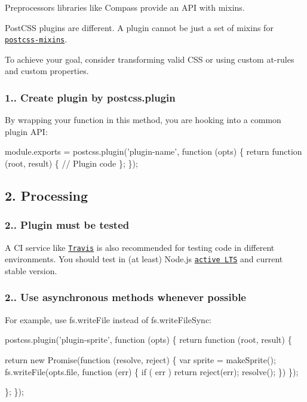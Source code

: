 Preprocessors libraries like Compass provide an A\+PI with mixins.

Post\+C\+SS plugins are different. A plugin cannot be just a set of mixins for \href{https://github.com/postcss/postcss-mixins}{\tt postcss-\/mixins}.

To achieve your goal, consider transforming valid C\+SS or using custom at-\/rules and custom properties.

\subsubsection*{1.. Create plugin by {\ttfamily postcss.\+plugin}}

By wrapping your function in this method, you are hooking into a common plugin A\+PI\+:


\begin{DoxyCode}
module.exports = postcss.plugin('plugin-name', function (opts) \{
    return function (root, result) \{
        // Plugin code
    \};
\});
\end{DoxyCode}


\subsection*{2. Processing}

\subsubsection*{2.. Plugin must be tested}

A CI service like \href{https://travis-ci.org/}{\tt Travis} is also recommended for testing code in different environments. You should test in (at least) Node.\+js \href{https://github.com/nodejs/LTS}{\tt active L\+TS} and current stable version.

\subsubsection*{2.. Use asynchronous methods whenever possible}

For example, use {\ttfamily fs.\+write\+File} instead of {\ttfamily fs.\+write\+File\+Sync}\+:


\begin{DoxyCode}
postcss.plugin('plugin-sprite', function (opts) \{
    return function (root, result) \{

        return new Promise(function (resolve, reject) \{
            var sprite = makeSprite();
            fs.writeFile(opts.file, function (err) \{
                if ( err ) return reject(err);
                resolve();
            \})
        \});

    \};
\});
\end{DoxyCode}


